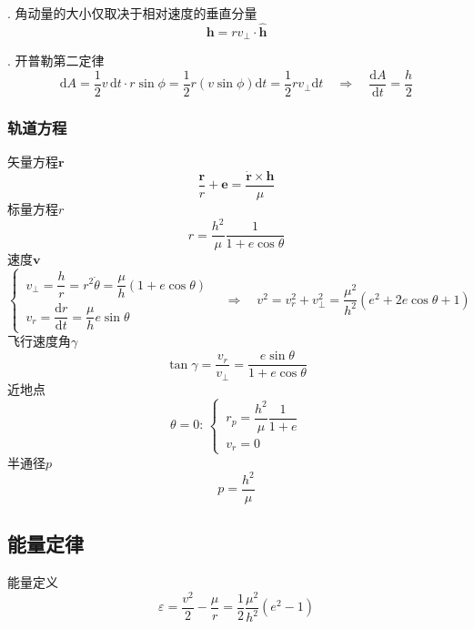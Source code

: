 \documentclass[10pt,a4]{article}
\numberwithin{equation}{section}
\renewcommand{\d}{\text{d}}
\begin{document}
. 角动量的大小仅取决于相对速度的垂直分量
\begin{equation}
	\bm{h} = r v_{\bot}\cdot \hat{\bm{h}}
\end{equation} 

. 开普勒第二定律
\begin{equation}
	\d A = \dfrac{1}{2} v \, \d t  \cdot r\sin \phi = \dfrac{1}{2}r(v \sin \phi )\d t = \dfrac{1}{2} r v_{\bot}\d t  \quad \Rightarrow \quad \dfrac{\d A}{\d t} = \dfrac{h}{2}
\end{equation}

\subsubsection{轨道方程}
矢量方程$\bm{r}$
\begin{equation}
	\dfrac{\bm{r}}{r} + \bm{e} = \dfrac{\dot{\bm{r}}\times \bm{h}}{\mu}
\end{equation}
标量方程$r$
\begin{equation}
	r = \dfrac{h^2}{\mu} \dfrac{1}{1 + e \cos \theta}
\end{equation}
速度$\bm{v}$
\begin{equation}
	\begin{cases}
		\, v_{\bot} = \dfrac{h}{r} = r^2 \dot{\theta} = \dfrac{\mu}{h}(1 + e \cos \theta)\\[0.8em]
		\, v_r = \dfrac{\d r}{\d t} = \dfrac{\mu}{h}e \sin \theta
	\end{cases}
	\quad \Rightarrow \quad v^2 = v_r^2 + v_{\bot}^2 = \dfrac{\mu^2}{h^2}(e^2 + 2e\cos \theta + 1)
\end{equation}
飞行速度角$\gamma$
\begin{equation}
	\tan \gamma = \dfrac{v_r}{v_{\bot}} = \dfrac{e \sin \theta}{1 + e \cos \theta}
\end{equation}
近地点
\begin{equation}
	\theta = 0: \,
	\begin{cases}
		\, r_p = \dfrac{h^2}{\mu} \dfrac{1}{1 + e}\\
		\, v_r = 0
	\end{cases}
\end{equation}
半通径$p$
\begin{equation}
	p = \dfrac{h^2}{\mu}
\end{equation}

\subsection{能量定律}
能量定义
\begin{equation}
	\varepsilon = \dfrac{v^2}{2} - \dfrac{\mu}{r} = \dfrac{1}{2} \dfrac{\mu^2}{h^2}(e^2 - 1)
\end{equation}
\end{document}

